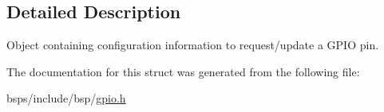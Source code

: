 \subsection{Detailed Description}
Object containing configuration information to request/update a G\+P\+IO pin. 

The documentation for this struct was generated from the following file\+:\begin{DoxyCompactItemize}
\item 
bsps/include/bsp/\mbox{\hyperlink{gpio_8h}{gpio.\+h}}\end{DoxyCompactItemize}
